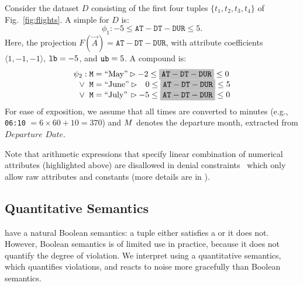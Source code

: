 \begin{example}\label{ex:constraints}
    Consider the dataset $D$ consisting of the first four tuples  $\{t_1, t_2, t_3, t_4\}$ of Fig.~\ref{fig:flights}.
    A simple \invariant for $D$ is:
	{
	$$
    \phi_1: -5\leq \mathtt{AT} - \mathtt{DT} - \mathtt{DUR} \leq 5.
	$$
	}
    Here, the projection ${F(\vec{A})} = \mathtt{AT} - \mathtt{DT} - \mathtt{DUR}$, with attribute coefficients
    $\langle 1, - 1, -1 \rangle$, ${\mathtt{lb}} = {-}5$, and ${\mathtt{ub}} = 5$. A compound
    \invariant is:
	{
	\begin{align*}
     \psi_2:   \mathtt{\monthy} &= \text{``May''}  \maxand -2 \leq \mathcolorbox{lightgray}{\mathtt{AT} - \mathtt{DT} - \mathtt{DUR}} \leq 0 \\[-0.4em]
     \vee \;\; \mathtt{\monthy} &= \text{``June''} \maxand \phantom{-}0  \leq \mathcolorbox{lightgray}{\mathtt{AT} - \mathtt{DT} - \mathtt{DUR}} \leq 5\\[-0.4em]
     \vee \;\; \mathtt{\monthy} &= \text{``July''} \, \maxand {-}5 \leq \mathcolorbox{lightgray}{\mathtt{AT} - \mathtt{DT} - \mathtt{DUR}} \leq 0
	\end{align*}
	}
     For ease of exposition, we assume that all times are converted to minutes
     (e.g., \texttt{06:10} $= 6 \times 60 + 10 = 370$) and $M$ denotes
     the departure month, extracted from $Departure$ $Date$.
\end{example}

Note that arithmetic expressions that specify linear combination of numerical
attributes (highlighted above) are disallowed in denial
constraints~\cite{DBLP:journals/pvldb/ChuIP13} which only allow raw attributes
and constants (more details are in \appOrTechRep).




\subsection{Quantitative Semantics}\label{quant-sem}

 \Dis have a natural Boolean semantics: a tuple either satisfies a
\invariant or it does not. However, Boolean semantics is of limited use in
practice, because it does not quantify the degree of \invariant violation. We
interpret \dis using a quantitative semantics, which quantifies violations, and
reacts to noise more gracefully than Boolean semantics.

